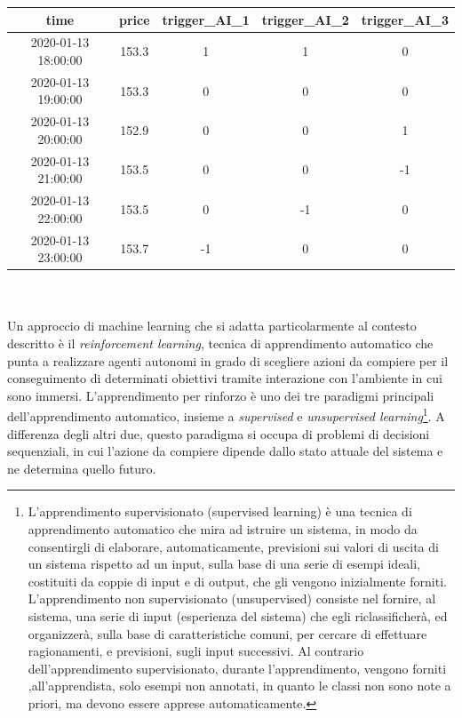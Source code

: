 \documentclass[a4paper,12pt]{report}
\begin{document}
\begin{fig}
\begin{fig}
	\begin{center}
	\begin{tabular}{||c c c c c ||} 
		\hline
		time & price & trigger\_AI\_1 & trigger\_AI\_2 & trigger\_AI\_3 \\ [0.5ex] 
		\hline\hline
		2020-01-13 18:00:00 & 153.3 & 1 & 1 & 0\\
		\hline
		2020-01-13 19:00:00 & 153.3 & 0 & 0 & 0\\
		\hline
		2020-01-13 20:00:00 & 152.9 & 0 & 0 & 1\\
		\hline
		2020-01-13 21:00:00 & 153.5 & 0 & 0 & -1\\
		\hline
		2020-01-13 22:00:00 & 153.5 & 0 & -1 & 0\\
		\hline
		2020-01-13 23:00:00 & 153.7 & -1 & 0 & 0\\ [1ex] 
		\hline
	\end{tabular}
	\end{center}
	\label{Tabella 3}
\end{fig}
\\~\\Un approccio di machine learning che si adatta particolarmente al contesto descritto è il \textit{reinforcement learning}, tecnica di apprendimento automatico che punta a realizzare agenti autonomi in grado di scegliere azioni da compiere per il conseguimento di determinati obiettivi tramite interazione con l'ambiente in cui sono immersi.
L'apprendimento per rinforzo \cite{rl} è uno dei tre paradigmi principali dell'apprendimento automatico, insieme a \textit{supervised} e \textit{unsupervised learning}\footnote{L'apprendimento supervisionato (supervised learning) è una tecnica di apprendimento automatico che mira ad istruire un sistema, in modo da consentirgli di elaborare, automaticamente, previsioni sui valori di uscita di un sistema rispetto ad un input, sulla base di una serie di esempi ideali, costituiti da coppie di input e di output, che gli vengono inizialmente forniti.\\ L'apprendimento non supervisionato (unsupervised) consiste nel fornire, al sistema, una serie di input (esperienza del sistema) che egli riclassificherà, ed organizzerà, sulla base di caratteristiche comuni, per cercare di effettuare ragionamenti, e previsioni, sugli input successivi. Al contrario dell'apprendimento supervisionato, durante l'apprendimento, vengono forniti ,all'apprendista, solo esempi non annotati, in quanto le classi non sono note a priori, ma devono essere apprese automaticamente. }. A differenza degli altri due, questo paradigma si occupa di problemi di decisioni sequenziali, in cui l'azione da compiere dipende dallo stato attuale del sistema e ne determina quello futuro.\\

\end{fig}
\end{document}
